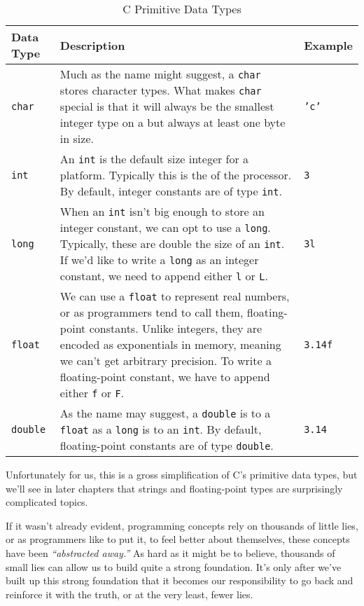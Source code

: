 \providecommand{\zgtcchar}{
Much as the name might suggest, a \texttt{char} stores character
types.  What makes \texttt{char} special is that it will always
be the smallest integer type on a \vocab{host architecture} but always
at least one byte in size.
}
\providecommand{\zgtcint}{
An \texttt{int} is the default size integer for a platform.
Typically this is the \vocab{word size} of the processor.  By default,
integer constants are of type \texttt{int}.
}
\providecommand{\zgtclong}{
When an \texttt{int} isn't big enough to store an integer
constant, we can opt to use a \texttt{long}.  Typically, these
are double the size of an \texttt{int}.  If we'd like to write a
\texttt{long} as an integer constant, we need to append either
\texttt{l} or \texttt{L}.
}
\providecommand{\zgtcfloat}{
We can use a \texttt{float} to represent real numbers, or as
programmers tend to call them, floating-point constants.  Unlike
integers, they are encoded as exponentials in memory, meaning we can't
get arbitrary precision.  To write a floating-point constant, we have to
append either \texttt{f} or \texttt{F}.
}
\providecommand{\zgtcdouble}{
As the name may suggest, a \texttt{double} is to a
\texttt{float} as a \texttt{long} is to an
\texttt{int}.  By default, floating-point constants are of type
\texttt{double}.
}

\begin{table}[h!]
\centering
\begin{tabular}{lp{}l}
\toprule
Data Type & Description & Example \\
\midrule
\texttt{char}   & \zgtcchar   & \texttt{'c'}   \\
\texttt{int}    & \zgtcint    & \texttt{3}     \\
\texttt{long}   & \zgtclong   & \texttt{3l}    \\
\texttt{float}  & \zgtcfloat  & \texttt{3.14f} \\
\texttt{double} & \zgtcdouble & \texttt{3.14}  \\
\bottomrule
\end{tabular}
\caption{C Primitive Data Types}
\label{table:variable-basics-and-control-flow:c-primitive-data-types}
\end{table}

\noindent
Unfortunately for us, this is a gross simplification of C's primitive
data types, but we'll see in later chapters that strings and
floating-point types are surprisingly complicated topics.

If it wasn't already evident, programming concepts rely on thousands of
little lies, or as programmers like to put it, to feel better about
themselves, these concepts have been \emph{\enquote{abstracted away.}}
As hard as it might be to believe, thousands of small lies can allow us
to build quite a strong foundation.  It's only after we've built up this
strong foundation that it becomes our responsibility to go back and
reinforce it with the truth, or at the very least, fewer lies.
